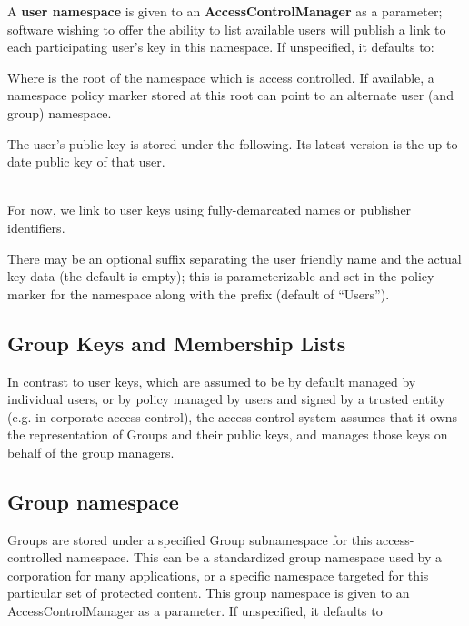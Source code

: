 A {\bf user namespace} is given to an {\bf AccessControlManager} as a
parameter; software wishing to offer the ability to list available
users will publish a link to each participating user's key in this
namespace. If unspecified, it defaults to:


Where  is the root of the
namespace which is access controlled. If available, a namespace policy
marker stored at this root can point to an alternate user (and group)
namespace.

The user's public key is stored under the following. Its latest
version is the up-to-date public key of that user.

\\

For now, we link to user keys using fully-demarcated names or
publisher identifiers.

There may be an optional suffix separating the user friendly name and
the actual key data (the default is empty); this is parameterizable
and set in the policy marker for the namespace along with the prefix
(default of ``Users'').

\subsection{Group Keys and Membership Lists}

In contrast to user keys, which are assumed to be by default managed
by individual users, or by policy managed by users and signed by a
trusted entity (e.g. in corporate access control), the access control
system assumes that it owns the representation of Groups and their
public keys, and manages those keys on behalf of the group managers.


\subsection{Group namespace}

Groups are stored under a specified Group subnamespace for this
access-controlled namespace. This can be a standardized group
namespace used by a corporation for many applications, or a specific
namespace targeted for this particular set of protected content. This
group namespace is given to an AccessControlManager as a parameter. If
unspecified, it defaults to

\\


